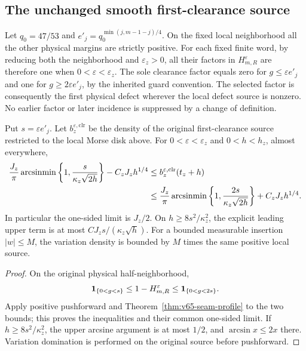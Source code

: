 \subsection{The unchanged smooth first-clearance source}
Let $q_0=47/53$ and $e'_j=q_0^{\min(j,m-1-j)/4}$. On the fixed
local neighborhood all the other physical margins are strictly
positive. For each fixed finite word, by reducing both the neighborhood
and $\varepsilon_z>0$, all their factors in $H_{m,R}^\varepsilon$
are therefore one when $0<\varepsilon<\varepsilon_z$. The sole
clearance factor equals zero for $g\le\varepsilon e'_j$ and one
for $g\ge2\varepsilon e'_j$, by the inherited guard convention.
The selected factor is consequently the first physical defect wherever
the local defect source is nonzero. No earlier factor or later incidence
is suppressed by a change of definition.

\begin{corollary}
\label{cor:v65-original-seam-source}
Put $s=\varepsilon e'_j$. Let $b^{\varepsilon,\mathrm{clr}}_z$ be
the density of the original first-clearance source restricted to the
local Morse disk above. For $0<\varepsilon<\varepsilon_z$ and
$0<h<h_z$, almost everywhere,
\begin{align}\label{eq:v65-guard-profile}
 \frac{J_z}{\pi}\arcsin\!\min\left\{1,
                       \frac{s}{\kappa_z\sqrt{2h}}\right\}
                   -C_zJ_zh^{1/4}
 &\le b^{\varepsilon,\mathrm{clr}}_z(t_z+h)\notag\\
 &\le\frac{J_z}{\pi}\arcsin\!\min\left\{1,
                       \frac{2s}{\kappa_z\sqrt{2h}}\right\}
                   +C_zJ_zh^{1/4}.
\end{align}
In particular the one-sided limit is $J_z/2$. On
$h\ge8s^2/\kappa_z^2$, the explicit leading upper term is at most
$C J_zs/(\kappa_z\sqrt h)$. For a bounded measurable insertion
$|w|\le M$, the variation density is bounded by $M$ times the same
positive local source.
\end{corollary}
\begin{proof}
On the original physical half-neighborhood,
\[
 \mathbf1_{\{0<g<s\}}\le1-H_{m,R}^\varepsilon
                         \le\mathbf1_{\{0<g<2s\}}.
\]
Apply positive pushforward and Theorem~\ref{thm:v65-seam-profile}
to the two bounds; this proves the inequalities and their common
one-sided limit. If $h\ge8s^2/\kappa_z^2$, the upper arcsine argument
is at most $1/2$, and $\arcsin x\le2x$ there. Variation domination
is performed on the original source before pushforward.
\end{proof}

